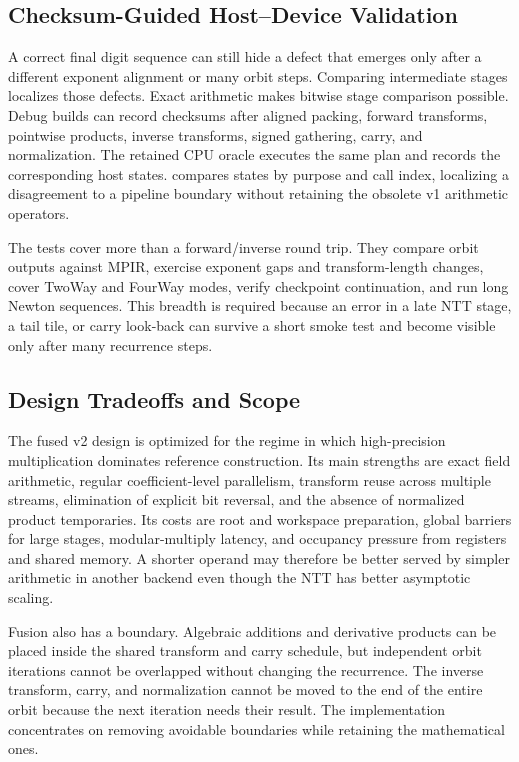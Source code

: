 \subsection{Checksum-Guided Host--Device Validation}
\label{sec:checksums}

A correct final digit sequence can still hide a defect that emerges only
after a different exponent alignment or many orbit steps.  Comparing intermediate
stages localizes those defects.  Exact arithmetic makes bitwise stage comparison possible.  Debug builds can
record checksums after aligned packing, forward transforms, pointwise products,
inverse transforms, signed gathering, carry, and normalization.  The retained
 CPU oracle executes the same plan and records
the corresponding host states.   compares states by
purpose and call index, localizing a disagreement to a pipeline boundary
without retaining the obsolete v1 arithmetic operators.

The tests cover more than a forward/inverse round trip.  They compare orbit
outputs against MPIR, exercise exponent gaps and transform-length changes,
cover TwoWay and FourWay modes, verify checkpoint continuation, and run long
Newton sequences.  This breadth is required because an error in a late NTT
stage, a tail tile, or carry look-back can survive a short smoke test and become
visible only after many recurrence steps.

\subsection{Design Tradeoffs and Scope}
\label{subsec:fused-ntt-tradeoffs}

The fused v2 design is optimized for the regime in which high-precision
multiplication dominates reference construction.  Its main strengths are exact
field arithmetic, regular coefficient-level parallelism, transform reuse across
multiple streams, elimination of explicit bit reversal, and the absence of
normalized product temporaries.  Its costs are root and workspace preparation,
global barriers for large stages, modular-multiply latency, and occupancy
pressure from registers and shared memory.  A shorter operand may therefore be
better served by simpler arithmetic in another backend even though the NTT has
better asymptotic scaling.

Fusion also has a boundary.  Algebraic additions and derivative products can be
placed inside the shared transform and carry schedule, but independent orbit
iterations cannot be overlapped without changing the recurrence.  The inverse
transform, carry, and normalization cannot be moved to the end of the entire
orbit because the next iteration needs their result.  The implementation
concentrates on removing avoidable boundaries while retaining the mathematical
ones.

